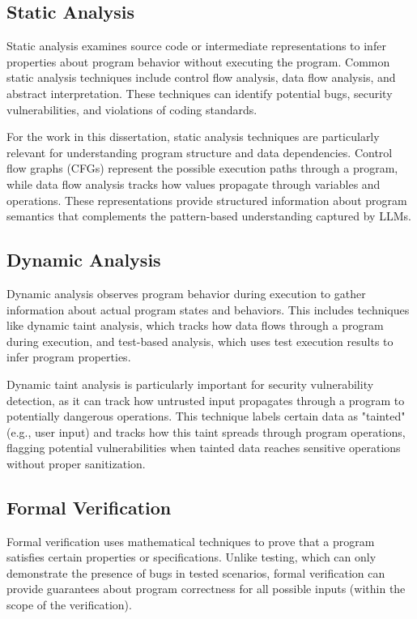 \documentclass[12pt,openany,oneside,table]{cmuthesis}
\begin{document}
\subsection{Static Analysis}

Static analysis examines source code or intermediate representations to infer properties about program behavior without executing the program. Common static analysis techniques include control flow analysis, data flow analysis, and abstract interpretation. These techniques can identify potential bugs, security vulnerabilities, and violations of coding standards.

For the work in this dissertation, static analysis techniques are particularly relevant for understanding program structure and data dependencies. Control flow graphs (CFGs) represent the possible execution paths through a program, while data flow analysis tracks how values propagate through variables and operations. These representations provide structured information about program semantics that complements the pattern-based understanding captured by LLMs.

\subsection{Dynamic Analysis}

Dynamic analysis observes program behavior during execution to gather information about actual program states and behaviors. This includes techniques like dynamic taint analysis, which tracks how data flows through a program during execution, and test-based analysis, which uses test execution results to infer program properties.

Dynamic taint analysis is particularly important for security vulnerability detection, as it can track how untrusted input propagates through a program to potentially dangerous operations. This technique labels certain data as "tainted" (e.g., user input) and tracks how this taint spreads through program operations, flagging potential vulnerabilities when tainted data reaches sensitive operations without proper sanitization.

\subsection{Formal Verification}

Formal verification uses mathematical techniques to prove that a program satisfies certain properties or specifications. Unlike testing, which can only demonstrate the presence of bugs in tested scenarios, formal verification can provide guarantees about program correctness for all possible inputs (within the scope of the verification).
\end{document}

